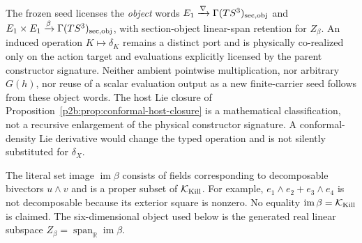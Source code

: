 \documentclass[12pt,a4paper]{article}
\begin{document}
\begin{remark}
\label{p2b:rem:typed-momentum-operation-grammar}
The frozen seed licenses the \emph{object} words
\(E_1\xrightarrow{\nabla}\Gamma(TS^3)_{\rm sec,obj}\) and
\(E_1\times E_1\xrightarrow{\beta}\Gamma(TS^3)_{\rm sec,obj}\),
with section-object linear-span retention for \(Z_\beta\).  An induced
operation \(K\mapsto\delta_K\) remains a distinct port and is physically
co-realized only on the action target and evaluations explicitly licensed by
the parent constructor signature.  Neither ambient pointwise multiplication,
nor arbitrary \(G(h)\), nor reuse of a scalar evaluation output as a new
finite-carrier seed follows from these object words.  The host Lie closure
of Proposition~\ref{p2b:prop:conformal-host-closure} is a mathematical
classification, not a recursive enlargement of the physical constructor
signature.  A conformal-density Lie derivative would change the typed
operation and is not silently substituted for \(\delta_X\).
\end{remark}

\begin{remark}
\label{p2b:rem:beta-set-image-linear-hull}
The literal set image \(\operatorname{im}\beta\) consists of fields
corresponding to decomposable bivectors \(u\wedge v\) and is a proper subset
of \(\mathcal K_{\rm Kill}\).  For example,
\(e_1\wedge e_2+e_3\wedge e_4\) is not decomposable because its exterior
square is nonzero.  No equality
\(\operatorname{im}\beta=\mathcal K_{\rm Kill}\) is claimed.  The
six-dimensional object used below is the generated real linear subspace
\(Z_\beta=\operatorname{span}_{\mathbb R}\operatorname{im}\beta\).
\end{remark}
\end{document}
